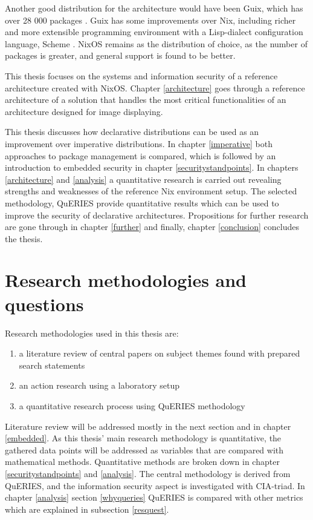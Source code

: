 Another good distribution for the architecture would have been Guix, which has over
28 000 packages \cite{gnuPackagesx2014}. Guix has some improvements
over Nix, including richer and more extensible programming environment
with a Lisp-dialect configuration language, Scheme
\cite{courtes2021deploiements}. NixOS remains as the distribution of
choice, as the number of packages is greater, and general support is
found to be better.

This thesis focuses on the systems and information security of a
reference architecture created with NixOS. Chapter \ref{architecture}
goes through a reference architecture of a solution that handles the
most critical functionalities of an architecture designed for image displaying.

This thesis discusses how declarative distributions can be used as an
improvement over imperative distributions. In chapter \ref{imperative} both approaches to package
management is compared, which is followed by an introduction to
embedded security in chapter \ref{securitystandpoints}. In chapters
\ref{architecture} and \ref{analysis} a quantitative research is
carried out revealing strengths and weaknesses of the reference Nix
environment setup. The selected methodology, QuERIES provide
quantitative results which can be used to improve the security of
declarative architectures. Propositions for further research are
gone through in chapter \ref{further} and finally, chapter
\ref{conclusion} concludes the thesis.

\section{Research methodologies and questions}

Research methodologies used in this thesis are:
\begin{enumerate}
\item a literature review of central papers on subject themes found
  with prepared search statements
\item an action research using a laboratory setup
\item a quantitative research process using QuERIES methodology
\end{enumerate}

Literature review will be addressed mostly in the next section and in
chapter \ref{embedded}. As this thesis' main research methodology is
quantitative, the gathered data points will be addressed as variables
that are compared with mathematical methods. Quantitative methods are
broken down in chapter \ref{securitystandpoints} and
\ref{analysis}. The central methodology is derived from QuERIES, and
the information security aspect is investigated with CIA-triad. In
chapter \ref{analysis} section \ref{whyqueries} QuERIES is compared
with other metrics which are explained in subsection \ref{resquest}.

